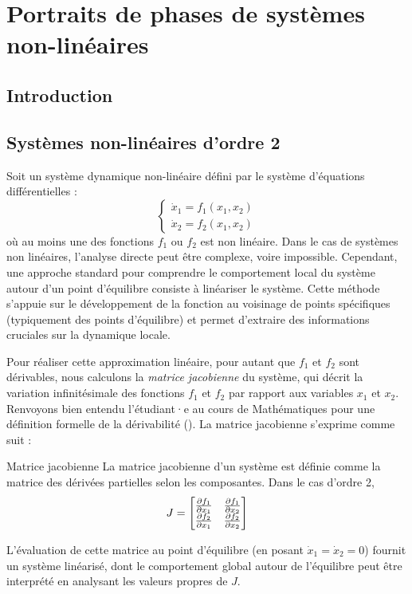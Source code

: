 \chapter{Portraits de phases de systèmes non-linéaires}
    \section{Introduction}
    \section{Systèmes non-linéaires d'ordre 2}
        Soit un système dynamique non-linéaire défini par le système d'équations différentielles :
        \begin{equation}
            \begin{cases}
                \dot{x}_1 = f_1(x_1, x_2) \\
                \dot{x}_2 = f_2(x_1, x_2)
            \end{cases}
        \end{equation}
        où au moins une des fonctions $f_1$ ou $f_2$ est non linéaire. Dans le cas de systèmes non linéaires, l'analyse directe peut être complexe, voire impossible. Cependant, une approche standard pour comprendre le comportement local du système autour d'un point d'équilibre consiste à linéariser le système. Cette méthode s'appuie sur le développement de la fonction au voisinage de points spécifiques (typiquement des points d'équilibre) et permet d'extraire des informations cruciales sur la dynamique locale.

        Pour réaliser cette approximation linéaire, pour autant que $f_1$ et $f_2$ sont dérivables, nous calculons la \textit{matrice jacobienne} du système, qui décrit la variation infinitésimale des fonctions $f_1$ et $f_2$ par rapport aux variables $x_1$ et $x_2$. Renvoyons bien entendu l'étudiant·e au cours de Mathématiques pour une définition formelle de la dérivabilité (\cite{mathf117}). La matrice jacobienne s'exprime comme suit :

        \begin{definition}{Matrice jacobienne}
            La matrice jacobienne d'un système est définie comme la matrice des dérivées partielles selon les composantes. Dans le cas d'ordre 2,
            \begin{equation}
                J = 
                \begin{bmatrix}
                    \frac {\partial {f_1}}{\partial {x_1}} & \frac {\partial {f_1}}{\partial {x_2}} \\
                    \frac {\partial {f_2}}{\partial {x_1}} & \frac {\partial {f_2}}{\partial {x_2}}
                \end{bmatrix}
            \end{equation}
        \end{definition}
        L'évaluation de cette matrice au point d'équilibre (en posant $\dot{x}_1 = \dot{x}_2 = 0$) fournit un système linéarisé, dont le comportement global autour de l'équilibre peut être interprété en analysant les valeurs propres de $J$.

